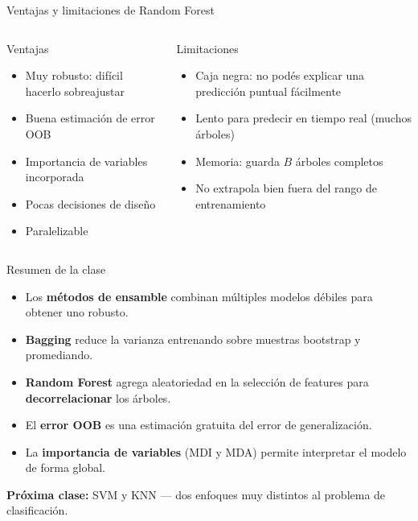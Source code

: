 \documentclass[aspectratio=169]{beamer}
\begin{document}
\begin{frame}{Ventajas y limitaciones de Random Forest}
  \begin{columns}
    \begin{block}{Ventajas}
      \begin{itemize}
        \item Muy robusto: difícil hacerlo sobreajustar
        \item Buena estimación de error OOB
        \item Importancia de variables incorporada
        \item Pocas decisiones de diseño
        \item Paralelizable
      \end{itemize}
    \end{block}

    \begin{alertblock}{Limitaciones}
      \begin{itemize}
        \item Caja negra: no podés explicar una predicción puntual fácilmente
        \item Lento para predecir en tiempo real (muchos árboles)
        \item Memoria: guarda $B$ árboles completos
        \item No extrapola bien fuera del rango de entrenamiento
      \end{itemize}
    \end{alertblock}
  \end{columns}
\end{frame}

\begin{frame}{Resumen de la clase}
  \begin{itemize}
    \item Los \textbf{métodos de ensamble} combinan múltiples modelos débiles para obtener uno robusto.
    \item \textbf{Bagging} reduce la varianza entrenando sobre muestras bootstrap y promediando.
    \item \textbf{Random Forest} agrega aleatoriedad en la selección de features para \textbf{decorrelacionar} los árboles.
    \item El \textbf{error OOB} es una estimación gratuita del error de generalización.
    \item La \textbf{importancia de variables} (MDI y MDA) permite interpretar el modelo de forma global.
  \end{itemize}

  \bigskip
  \textbf{Próxima clase:} SVM y KNN --- dos enfoques muy distintos al problema de clasificación.
\end{frame}
\end{document}
